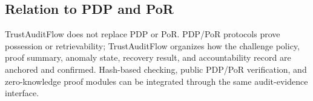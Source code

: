 \subsection{Relation to PDP and PoR}

TrustAuditFlow does not replace PDP or PoR. PDP/PoR protocols prove possession or retrievability; TrustAuditFlow organizes how the challenge policy, proof summary, anomaly state, recovery result, and accountability record are anchored and confirmed. Hash-based checking, public PDP/PoR verification, and zero-knowledge proof modules can be integrated through the same audit-evidence interface.
